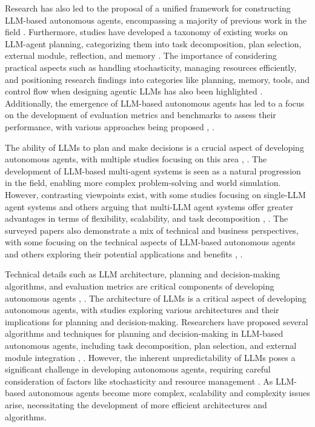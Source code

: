\documentclass[conference]{IEEEtran}
\begin{document}
Research has also led to the proposal of a unified framework for constructing LLM-based autonomous agents, encompassing a majority of previous work in the field \cite{2308.11432}. Furthermore, studies have developed a taxonomy of existing works on LLM-agent planning, categorizing them into task decomposition, plan selection, external module, reflection, and memory \cite{2402.02716}. The importance of considering practical aspects such as handling stochasticity, managing resources efficiently, and positioning research findings into categories like planning, memory, tools, and control flow when designing agentic LLMs has also been highlighted \cite{2412.04093}. Additionally, the emergence of LLM-based autonomous agents has led to a focus on the development of evaluation metrics and benchmarks to assess their performance, with various approaches being proposed \cite{2308.05960}, \cite{2409.14457}.

The ability of LLMs to plan and make decisions is a crucial aspect of developing autonomous agents, with multiple studies focusing on this area \cite{2402.02716}, \cite{2411.14033}. The development of LLM-based multi-agent systems is seen as a natural progression in the field, enabling more complex problem-solving and world simulation. However, contrasting viewpoints exist, with some studies focusing on single-LLM agent systems and others arguing that multi-LLM agent systems offer greater advantages in terms of flexibility, scalability, and task decomposition \cite{2401.03428}, \cite{2412.17481}. The surveyed papers also demonstrate a mix of technical and business perspectives, with some focusing on the technical aspects of LLM-based autonomous agents and others exploring their potential applications and benefits \cite{2411.14033}, \cite{2407.10735}.

Technical details such as LLM architecture, planning and decision-making algorithms, and evaluation metrics are critical components of developing autonomous agents \cite{2402.01680}, \cite{2308.11432}. The architecture of LLMs is a critical aspect of developing autonomous agents, with studies exploring various architectures and their implications for planning and decision-making. Researchers have proposed several algorithms and techniques for planning and decision-making in LLM-based autonomous agents, including task decomposition, plan selection, and external module integration \cite{2402.02716}, \cite{2411.14033}. However, the inherent unpredictability of LLMs poses a significant challenge in developing autonomous agents, requiring careful consideration of factors like stochasticity and resource management \cite{2412.04093}. As LLM-based autonomous agents become more complex, scalability and complexity issues arise, necessitating the development of more efficient architectures and algorithms.
\end{document}
